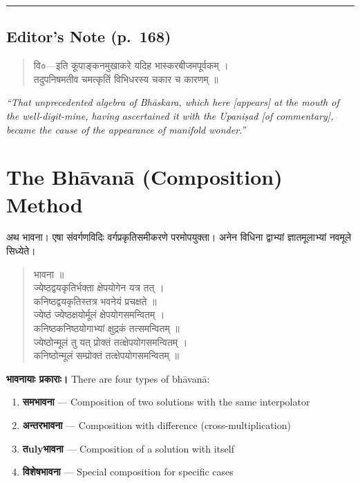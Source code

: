 \documentclass[11pt,a4paper]{article}
\newcommand{\longline}{\noindent\rule{\textwidth}{0.4pt}}
\newcommand{\cnote}[1]{\textcolor{notecolor}{\textit{#1}}}
\newcommand{\dev}[1]{{\devanagarifont #1}}
\newenvironment{sanskritverse}{%
  \begin{verse}
}{%
  \end{verse}
}
\newcommand{\vs}{\vspace{0.5em}}
\begin{document}
\longline

\subsection*{Editor's Note (p.\ 168)}

\begin{sanskritverse}
\dev{%
वि०—इति कूपाङ्कनमुखाकरे यदिह भास्करबीजमपूर्वकम् ।\\
तदुपनिषमतीव चमत्कृतिं विभिधरस्य चकार च कारणम् ॥}
\end{sanskritverse}

\cnote{``That unprecedented algebra of Bhāskara, which here [appears] at the mouth of the well-digit-mine, having ascertained it with the Upaniṣad [of commentary], became the cause of the appearance of manifold wonder.''}

\section*{The Bhāvanā (Composition) Method}

\lettrine[lines=3, lraise=0.1, nindent=0em, slope=-.5em]{\dev{अ}}{}थ भावना। एषा संवर्गणविदिः वर्गप्रकृतिसमीकरणे परमोपयुक्ता। अनेन विधिना द्वाभ्यां ज्ञातमूलाभ्यां नवमूले सिध्येते।

\vs

\begin{sanskritverse}
\dev{%
भावना ॥\\[0.5em]
ज्येष्ठद्वयकृतिर्भक्ता क्षेपयोगेन यत्र तत् ।\\
कनिष्ठद्वयकृतिस्तत्र भवनेयं प्रचक्षते ॥}\\[0.5em]
\dev{%
ज्येष्ठं ज्येष्ठक्षयोर्मूलं क्षेपयोगसमन्वितम् ।\\
कनिष्ठकनिष्ठयोगाभ्यां क्षुद्रकं तत्समन्वितम् ॥}\\[0.5em]
\dev{%
ज्येष्ठोन्मूलं तु यत् प्रोक्तं तत्क्षेपयोगसमन्वितम् ।\\
कनिष्ठोन्मूलं सम्प्रोक्तं तत्क्षेपयोगसमन्वितम् ॥}
\end{sanskritverse}

\vs

\noindent\textbf{\dev{भावनायाः प्रकाराः।}} There are four types of bh\={a}van\={a}:

\begin{enumerate}[label=\textbf{\dev{(\roman*)}}]
  \item \textbf{\dev{समभावना}} --- Composition of two solutions with the same interpolator
  \item \textbf{\dev{अन्तरभावना}} --- Composition with difference (cross-multiplication)
  \item \textbf{\dev{तulyभावना}} --- Composition of a solution with itself
  \item \textbf{\dev{विशेषभावना}} --- Special composition for specific cases
\end{enumerate}
\end{document}

